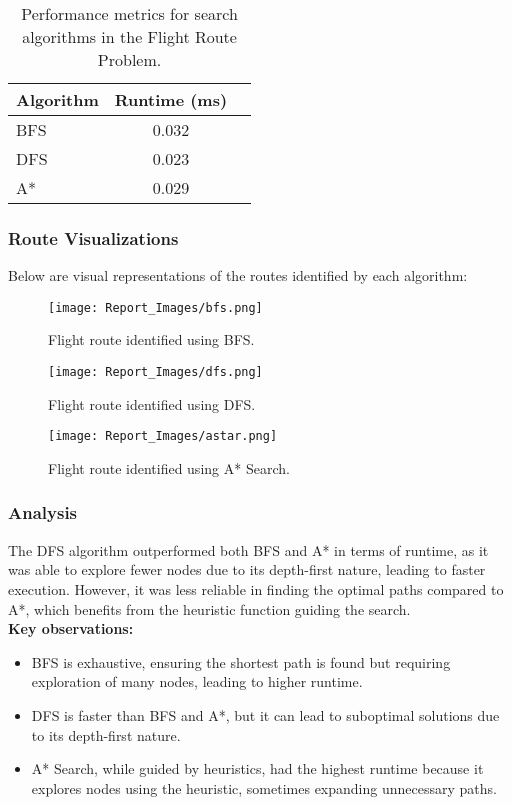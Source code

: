 \documentclass[12pt]{article}
\begin{document}
\begin{table}[h!]
    \centering
    \begin{tabular}{|l|c|c|}
        \hline
        Algorithm & Runtime (ms) \\
        \hline
        BFS & 0.032 \\
        DFS & 0.023 \\
        A* & 0.029 \\
        \hline
    \end{tabular}
    \caption{Performance metrics for search algorithms in the Flight Route Problem.}
    \label{tab:flight_route_performance}
\end{table}

\subsubsection{Route Visualizations}
Below are visual representations of the routes identified by each algorithm:
\begin{figure}[h!]
    \centering
    \texttt{[image: Report\_Images/bfs.png]}
    \caption{Flight route identified using BFS.}
    \label{fig:BFS}
\end{figure}
\begin{figure}[h!]
    \centering
    \texttt{[image: Report\_Images/dfs.png]}
    \caption{Flight route identified using DFS.}
    \label{fig:DFS}
\end{figure}
\begin{figure}[h!]
    \centering
    \texttt{[image: Report\_Images/astar.png]}
    \caption{Flight route identified using A* Search.}
    \label{fig:Astar}
\end{figure}
\newpage
\subsubsection{Analysis}
The DFS algorithm outperformed both BFS and A* in terms of runtime, as it was able to explore fewer nodes due to its depth-first nature, leading to faster execution. However, it was less reliable in finding the optimal paths compared to A*, which benefits from the heuristic function guiding the search.\\

\textbf{Key observations:}
\begin{itemize}
    \item BFS is exhaustive, ensuring the shortest path is found but requiring exploration of many nodes, leading to higher runtime.
    \item DFS is faster than BFS and A*, but it can lead to suboptimal solutions due to its depth-first nature.
    \item A* Search, while guided by heuristics, had the highest runtime because it explores nodes using the heuristic, sometimes expanding unnecessary paths.
\end{itemize}
\end{document}
